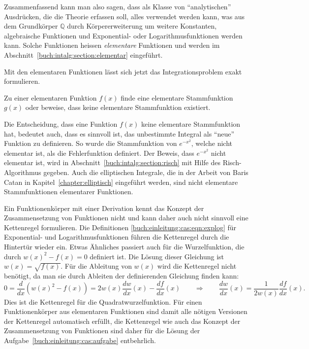 Zusammenfassend kann man also sagen, dass als Klasse von ``analytischen''
Ausdrücken, die die Theorie erfassen soll, alles verwendet werden kann,
was aus dem Grundkörper $\mathbb{Q}$ durch Körpererweiterung um
%
weitere Konstanten, algebraische Funktionen und Exponential- oder
Logarithmusfunktionen werden kann.
Solche Funktionen heissen \emph{elementare} Funktionen und werden
%
im Abschnitt~\ref{buch:intalg:section:elementar} eingeführt.

Mit den elementaren Funktionen lässt sich jetzt das Integrationsproblem
exakt formulieren.

\begin{aufgabe}
\label{buch:einleitung:cas:aufgabe}
Zu einer elementaren Funktion $f(x)$ finde eine elementare Stammfunktion
$g(x)$ oder beweise, dass keine elementare Stammfunktion existiert.
\end{aufgabe}

Die Entscheidung, dass eine Funktion $f(x)$ keine elementare
Stammfunktion hat, bedeutet auch, dass es sinnvoll ist, das unbestimmte
Integral als ``neue'' Funktion zu definieren.
So wurde die Stammfunktion von $e^{-x^2}$, welche nicht elementar ist,
als die Fehlerfunktion definiert.
Der Beweis, dass $e^{-x^2}$ nicht elementar ist, wird in
Abschnitt~\ref{buch:intalg:section:risch} mit Hilfe des Risch-Algorithmus
gegeben.
Auch die elliptischen Integrale, die in der Arbeit von Baris Catan 
in Kapitel~\ref{chapter:elliptisch} eingeführt werden, sind nicht
elementare Stammfunktionen elementarer Funktionen.

Ein Funktionenkörper mit einer Derivation kennt das Konzept der
Zusammensetzung von Funktionen nicht und kann daher auch nicht
sinnvoll eine Kettenregel formulieren.
Die Definitionen \eqref{buch:einleitung:cas:eqn:explog} für
Exponential- und Logarithmusfunktionen führen die Kettenregel
durch die Hintertür wieder ein.
Etwas Ähnliches passiert auch für die Wurzelfunktion, die durch
$w(x)^2-f(x)=0$ definiert ist.
Die Lösung dieser Gleichung ist $w(x)=\!\sqrt{f(x)}$.
Für die Ableitung von $w(x)$ wird die Kettenregel nicht benötigt, 
da man sie durch Ableiten der definierenden Gleichung finden kann:
\[
0
=
\frac{d}{dx}(w(x)^2-f(x))
=
2w(x)\frac{dw}{dx}(x) - \frac{df}{dx}(x)
\qquad\Rightarrow\qquad
\frac{dw}{dx}(x) = \frac{1}{2w(x)}\frac{df}{dx}(x).
\]
Dies ist die Kettenregel für die Quadratwurzelfunktion.
Für einen Funktionenkörper aus elementaren Funktionen sind damit
alle nötigen Versionen der Kettenregel automatisch erfüllt, die
Kettenregel wie auch das Konzept der Zusammensetzung von Funktionen
sind daher für die Lösung der Aufgabe~\ref{buch:einleitung:cas:aufgabe}
entbehrlich.

